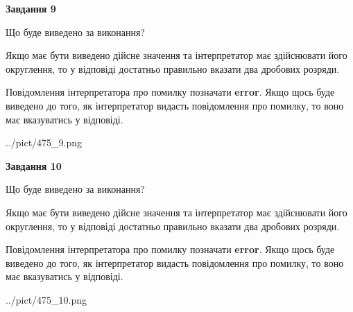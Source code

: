 \documentclass[12pt, ukrainian]{article}
\begin{document}
{\begin {Large}
{\begin {center}\textbf{Завдання 9}\end {center}}\par
Що буде виведено за виконання? \par

Якщо має бути виведено дійсне значення та інтерпретатор має здійснювати його округлення, 
то у відповіді достатньо правильно вказати два дробових розряди.

Повідомлення інтерпретатора про помилку позначати \textbf{error}.
Якщо щось буде виведено до того, як інтерпретатор видасть повідомлення про помилку, 
то воно має вказуватись у відповіді. \par

\begin{center}
	{../pict/475_9.png}
\end{center}
\newpage

{\begin {center}\textbf{Завдання 10}\end {center}}\par
Що буде виведено за виконання? \par

Якщо має бути виведено дійсне значення та інтерпретатор має здійснювати його округлення, 
то у відповіді достатньо правильно вказати два дробових розряди.

Повідомлення інтерпретатора про помилку позначати \textbf{error}.
Якщо щось буде виведено до того, як інтерпретатор видасть повідомлення про помилку, 
то воно має вказуватись у відповіді. \par

\begin{center}
	{../pict/475_10.png}
\end{center}
\newpage

\end {Large}}
\end{document}
